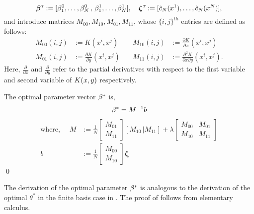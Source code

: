 \[
\boldsymbol{\beta}^{\hbox{\tiny\it T}}   := [\beta_1^0 ,\dots,  \beta_N^0 \,,\, \beta_1^1 ,\dots,  \beta_N^1],  \quad  \boldsymbol{\zeta}^{\hbox{\tiny\it T}}  := [\tilde c_N(x^1) ,\dots, \tilde c_N(x^N)],
\]
and introduce matrices $M_{00}, M_{10}, M_{01}, M_{11}$,  whose   $\{i,j\}^{th}$ entries are defined as follows:
\[
\begin{aligned}
M_{00}(i,j) &:= K(x^i,x^j)
\quad
& M_{10}(i,j) &:= \frac{\partial K}{\partial x}(x^i,x^j)
\\
M_{01}(i,j) &:= \frac{\partial K}{\partial y}(x^i,x^j)
\quad
& M_{11}(i,j) &:= \frac{\partial^2 K}{\partial x \partial y}(x^i,x^j).
\end{aligned}
\]	
Here, $\frac{\partial }{\partial x}$ and $\frac{\partial}{\partial y}$ refer to the partial derivatives with respect to the first variable and second variable of $K(x,y)$ respectively.
\begin{proposition}
	\label{prop:beta_star}
	The optimal parameter vector $\beta^*$ is,
	\begin{equation}
	\rkhsparam^* = M^{-1} b
	\label{e:rkhs_beta_2N}
	\end{equation}
	\begin{equation*}
	\begin{aligned}
	\text{where,
	}
	\quad
	M & := \frac{1}{N} \left[\begin{array}{c} M_{01}\\ \hline M_{11} \end{array}\right] [ M_{10} \,| M_{11}] + \lambda  \left[
	\begin{array}{c|c}
	M_{00} & M_{01} \\
	\hline
	M_{10} & M_{11}
	\end{array}
	\right] \\
	b & :=  \frac{1}{N} \left[ \begin{array}{c} M_{00} \\ \hline M_{10} \end{array}\right] \boldsymbol{\zeta}
	\end{aligned}
	\label{e:rkhs_beta_optimal}
	\end{equation*}
	\qed
\end{proposition}
The derivation of the optimal parameter $\beta^*$ is analogous to the derivation of the optimal $\theta^*$ in the finite basis case in . The proof of  follows from elementary calculus. 

